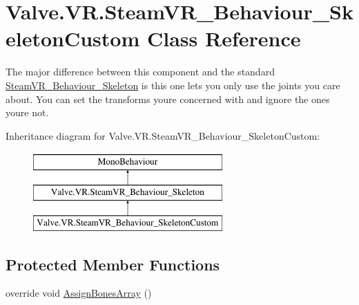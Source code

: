 \hypertarget{class_valve_1_1_v_r_1_1_steam_v_r___behaviour___skeleton_custom}{}\section{Valve.\+V\+R.\+Steam\+V\+R\+\_\+\+Behaviour\+\_\+\+Skeleton\+Custom Class Reference}
\label{class_valve_1_1_v_r_1_1_steam_v_r___behaviour___skeleton_custom}


The major difference between this component and the standard \mbox{\hyperlink{class_valve_1_1_v_r_1_1_steam_v_r___behaviour___skeleton}{Steam\+V\+R\+\_\+\+Behaviour\+\_\+\+Skeleton}} is this one lets you only use the joints you care about. You can set the transforms you\textquotesingle{}re concerned with and ignore the ones you\textquotesingle{}re not.  


Inheritance diagram for Valve.\+V\+R.\+Steam\+V\+R\+\_\+\+Behaviour\+\_\+\+Skeleton\+Custom\+:\begin{figure}[H]
\begin{center}
\leavevmode
\includegraphics[height=3.000000cm]{class_valve_1_1_v_r_1_1_steam_v_r___behaviour___skeleton_custom}
\end{center}
\end{figure}
\subsection*{Protected Member Functions}
\begin{DoxyCompactItemize}
\item 
override void \mbox{\hyperlink{class_valve_1_1_v_r_1_1_steam_v_r___behaviour___skeleton_custom_a5184aa62aa3f49cd99d826ca0a71bc87}{Assign\+Bones\+Array}} ()
\end{DoxyCompactItemize}
